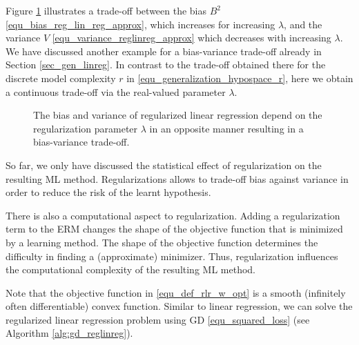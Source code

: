 \documentclass[12pt]{report}
\begin{document}
Figure \ref{fig_bias_variance_lambda} illustrates a trade-off between the bias $B^{2}$ 
\eqref{equ_bias_reg_lin_reg_approx}, which increases for increasing $\lambda$, 
and the variance $V$ \eqref{equ_variance_reglinreg_approx} which decreases with increasing $\lambda$.
We have discussed another example for a bias-variance trade-off already in Section \ref{sec_gen_linreg}. 
In contrast to the trade-off obtained there for the discrete model complexity $r$ in \eqref{equ_generalization_hypospace_r}, 
here we obtain a continuous trade-off via the real-valued parameter $\lambda$. 


\begin{figure}
\begin{center}
\end{center}
\caption{The bias and variance of regularized linear regression depend on the regularization parameter 
$\lambda$ in an opposite manner resulting in a bias-variance trade-off.}
\label{fig_bias_variance_lambda}
\end{figure}


So far, we only have discussed the statistical effect of regularization on the 
resulting ML method. Regularizations allows to trade-off bias against variance 
in order to reduce the risk of the learnt hypothesis. 

There is also a computational aspect to regularization. Adding a regularization 
term to the ERM changes the shape of the objective function that is minimized 
by a learning method. The shape of the objective function determines the difficulty 
in finding a (approximate) minimizer. Thus, regularization influences the computational
complexity of the resulting ML method.  

Note that the objective function in \eqref{equ_def_rlr_w_opt} is a smooth (infinitely often differentiable) 
convex function. Similar to linear regression, we can solve the regularized 
linear regression problem using GD \eqref{equ_squared_loss} 
(see Algorithm \ref{alg:gd_reglinreg}). 
\end{document}
